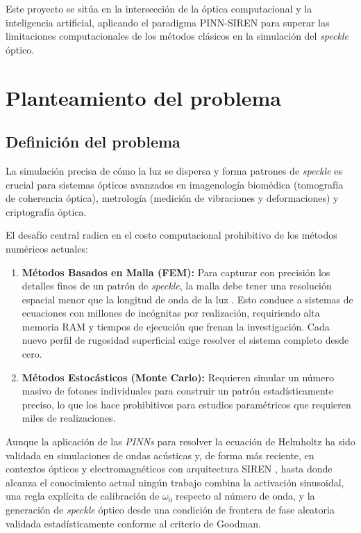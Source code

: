 Este proyecto se sitúa en la intersección de la óptica computacional y la
inteligencia artificial, aplicando el paradigma PINN-SIREN para superar las
limitaciones computacionales de los métodos clásicos en la simulación del
\textit{speckle} óptico.

\section{Planteamiento del problema}

\subsection{Definición del problema}

La simulación precisa de cómo la luz se dispersa y forma patrones de
\textit{speckle} es crucial para sistemas ópticos avanzados en imagenología
biomédica (tomografía de coherencia óptica), metrología (medición de
vibraciones y deformaciones) y criptografía óptica.

El desafío central radica en el costo computacional prohibitivo de los métodos
numéricos actuales:

\begin{enumerate}
    \item \textbf{Métodos Basados en Malla (FEM):} Para capturar con precisión
    los detalles finos de un patrón de \textit{speckle}, la malla debe tener
    una resolución espacial menor que la longitud de onda de la luz
    \parencite{jin2014finite}. Esto conduce a sistemas de ecuaciones con millones
    de incógnitas por realización, requiriendo alta memoria RAM y tiempos de
    ejecución que frenan la investigación. Cada nuevo perfil de rugosidad
    superficial exige resolver el sistema completo desde cero.

    \item \textbf{Métodos Estocásticos (Monte Carlo):} Requieren simular un
    número masivo de fotones individuales para construir un patrón estadísticamente
    preciso, lo que los hace prohibitivos para estudios paramétricos que requieren
    miles de realizaciones.
\end{enumerate}

Aunque la aplicación de las \textit{PINNs} para resolver la ecuación de
Helmholtz ha sido validada en simulaciones de ondas acústicas
\parencite{schoder2024helmholtz} y, de forma más reciente, en contextos
ópticos y electromagnéticos con arquitectura SIREN
\parencite{panagiotakopoulos2026helmholtz}, hasta donde alcanza el
conocimiento actual ningún trabajo combina la activación sinusoidal, una
regla explícita de calibración de $\omega_0$ respecto al número de onda, y
la generación de \textit{speckle} óptico desde una condición de frontera de
fase aleatoria validada estadísticamente conforme al criterio de Goodman.

